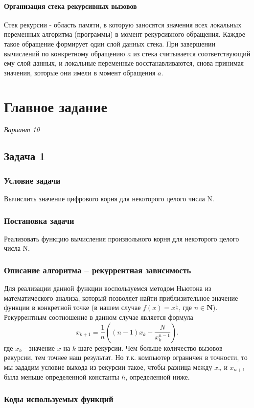 \documentclass[a4paper, 14pt]{extarticle}
\begin{document}
\paragraph{Организация стека рекурсивных вызовов}
Стек рекурсии - область памяти, в которую заносятся значения
всех локальных переменных алгоритма (программы) в момент рекурсивного обращения.
Каждое такое обращение формирует один слой данных стека.
При завершении вычислений по конкретному обращению $a$ из стека считывается
соответствующий ему слой данных, и локальные переменные восстанавливаются,
снова принимая значения, которые они имели в момент обращения $a$.
\newpage
\section{Главное задание}
\textit{Вариант 10}
\subsection{Задача 1}
\subsubsection{Условие задачи}
Вычислить значение цифрового корня для некоторого целого числа N.
\subsubsection{Постановка задачи}
Реализовать функцию вычисления произвольного корня для некоторого целого числа N.
\subsubsection{Описание алгоритма – рекуррентная зависимость}
Для реализации данной функции воспользуемся методом Ньютона из математического
анализа, который позволяет найти приблизительное значение функции в конкретной
точке (в нашем случае $f(x)=x^{\frac{1}{n}} $, где $n\in \mathbf{N}$).
Рекуррентным соотношение в данном случае является формула
\[
  x_{k+1}=\frac{1}{n}\left ((n-1)x_k+\frac{N}{x_k^{n-1}}\right )
.\] где $x_k$ - значение $x$ на $k$ шаге рекурсии. Чем больше количество
вызовов рекурсии, тем точнее наш результат. Но т.к. компьютер ограничен в точности,
то мы зададим условие выхода из рекурсии такое, чтобы разница между $x_n$ и
$x_{n+1}$ была меньше определенной константы $h$, определенной ниже.
\subsubsection{Коды используемых функций}

\end{document}
